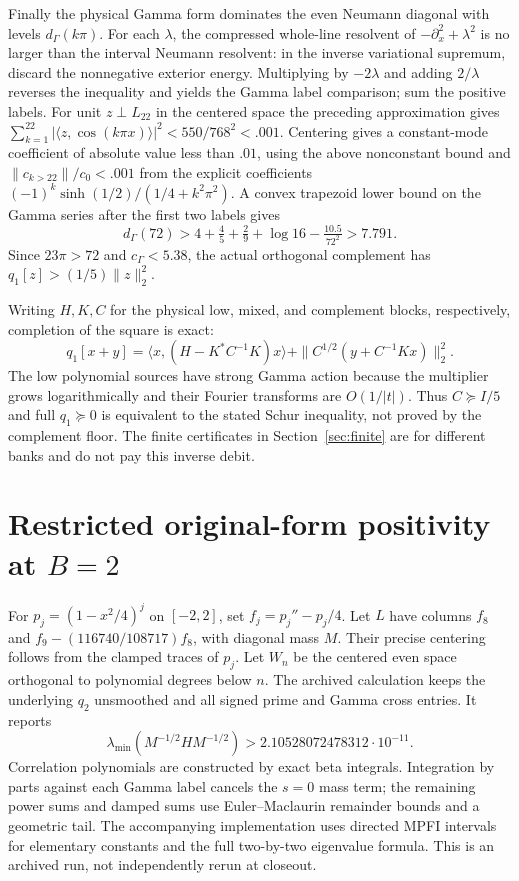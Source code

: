 \documentclass[11pt]{article}
\newcommand{\ip}[2]{\langle #1,#2\rangle}
\begin{document}
Finally the physical Gamma form dominates the even Neumann diagonal with levels $d_\Gamma(k\pi)$. For each $\lambda$, the compressed whole-line resolvent of $-\partial_x^2+\lambda^2$ is no larger than the interval Neumann resolvent: in the inverse variational supremum, discard the nonnegative exterior energy. Multiplying by $-2\lambda$ and adding $2/\lambda$ reverses the inequality and yields the Gamma label comparison; sum the positive labels. For unit $z\perp L_{22}$ in the centered space the preceding approximation gives $\sum_{k=1}^{22}|\ip{z}{\cos(k\pi x)}|^2<550/768^2<.001$. Centering gives a constant-mode coefficient of absolute value less than $.01$, using the above nonconstant bound and $\|c_{k>22}\|/c_0<.001$ from the explicit coefficients $(-1)^k\sinh(1/2)/(1/4+k^2\pi^2)$. A convex trapezoid lower bound on the Gamma series after the first two labels gives
\[
 d_\Gamma(72)>4+\tfrac45+\tfrac29+\log16-\tfrac{10.5}{72^2}>7.791.
\]
Since $23\pi>72$ and $c_\Gamma<5.38$, the actual orthogonal complement has $q_1[z]>(1/5)\|z\|_2^2$.

Writing $H,K,C$ for the physical low, mixed, and complement blocks, respectively, completion of the square is exact:
\[
 q_1[x+y]=\ip{x}{(H-K^*C^{-1}K)x}
       +\|C^{1/2}(y+C^{-1}Kx)\|_2^2.
\]
The low polynomial sources have strong Gamma action because the multiplier grows logarithmically and their Fourier transforms are $O(1/|t|)$. Thus $C\succeq I/5$ and full $q_1\succeq0$ is equivalent to the stated Schur inequality, not proved by the complement floor. The finite certificates in Section~\ref{sec:finite} are for different banks and do not pay this inverse debit.

\section[Restricted original form at B=2]{Restricted original-form positivity at $B=2$}
For $p_j=(1-x^2/4)^j$ on $[-2,2]$, set $f_j=p_j''-p_j/4$. Let $L$ have columns $f_8$ and $f_9-(116740/108717)f_8$, with diagonal mass $M$. Their precise centering follows from the clamped traces of $p_j$. Let $W_n$ be the centered even space orthogonal to polynomial degrees below $n$. The archived calculation keeps the underlying $q_2$ unsmoothed and all signed prime and Gamma cross entries. It reports
\[
 \lambda_{\min}(M^{-1/2}H M^{-1/2})>2.10528072478312\cdot10^{-11}.
\]
Correlation polynomials are constructed by exact beta integrals. Integration by parts against each Gamma label cancels the $s=0$ mass term; the remaining power sums and damped sums use Euler--Maclaurin remainder bounds \cite{dlmfsum} and a geometric tail. The accompanying implementation uses directed MPFI intervals for elementary constants and the full two-by-two eigenvalue formula. This is an archived run, not independently rerun at closeout.
\end{document}
